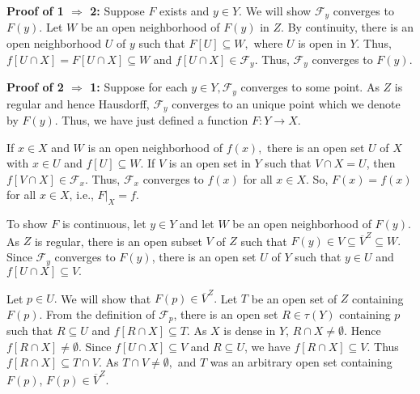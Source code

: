 \documentclass{article}
\begin{document}
		  \vskip 15pt


		  \textbf{Proof of 1 $\Rightarrow$ 2: } Suppose $F$ exists and $y\in Y$. We will show $\mathcal{F}_y$ converges to $F(y).$ Let $W$ be an open neighborhood of $F(y)$ in $Z$. By continuity, there is an open neighborhood $U$ of $y$ such that $F[U]\subseteq W,$ where $U$ is open in $Y$. Thus, $f\left[U\cap X\right]=F\left[U\cap X\right] \subseteq W$ and $f\left[U\cap X\right]\in \mathcal{F}_y$. Thus, $\mathcal{F}_y$ converges to $F(y)$.



		  \vskip 20pt


		  \textbf{Proof of 2 $\Rightarrow$ 1: } Suppose for each $y\in Y, \mathcal{F}_y$ converges to some point. As $Z$ is regular and hence Hausdorff, $\mathcal{F}_y$ converges to an unique point which we denote by $F(y)$. Thus, we have just defined a function $F:Y\rightarrow X$.

		  \vskip 10pt

		  If $x\in X$ and $W$ is an open neighborhood of $f(x),$ there is an open set $U$ of $X$ with $x\in U$ and $f[U]\subseteq W.$ 
		  If $V$ is an open set in $Y$ such that $V\cap X =U$, then $f\left[V\cap X\right] \in \mathcal{F}_x$. Thus, $\mathcal{F}_x$ converges to $f(x)$ for all $x\in X$. So, $F(x)=f(x)$ for all $x\in X$, i.e., $F|_X=f$.

		  \vskip 15pt

		  To show $F$ is continuous, let $y\in Y$ and let $W$ be an open neighborhood of $F(y)$. As $Z$ is regular, there is an open subset $V$ of $Z$ such that $F(y)\in V\subseteq \overline{V}^Z \subseteq W.$ Since $\mathcal{F}_y$ converges to $F(y)$, there is an open set $U$ of $Y$ such that $y\in U$ and $f\left[ U\cap X\right]\subseteq V.$

		  \vskip 10pt

		  Let $p\in U.$ We will show that $F(p)\in \overline{V}^Z.$ Let $T$ be an open set of $Z$ containing $F(p)$. From the definition of $\mathcal{F}_p$, there is an open set $R\in \tau(Y)$ containing $p$ such that $R\subseteq U$ and $f\left[R\cap X\right]\subseteq T.$ As $X$ is dense in $Y$, $R\cap X\neq \emptyset$. Hence $f\left[R\cap X\right]\neq \emptyset.$ Since $f\left[U\cap X\right]\subseteq V$ and $R\subseteq U$, we have $f\left[R\cap X\right]\subseteq V$. Thus $f\left[R\cap X\right]\subseteq T\cap V.$ As $T\cap V\neq \emptyset,$ and $T$ was an arbitrary open set containing $F(p)$, $F(p)\in \overline{V}^Z$.

		  \vskip 10pt
\end{document}
